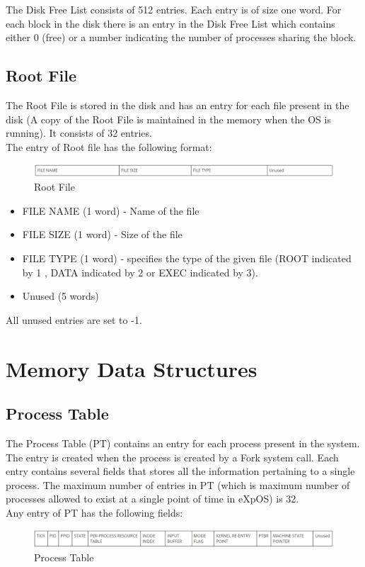 The Disk Free List consists of 512 entries. Each entry is of size one word. For each block in the disk there is an entry in the Disk Free List which contains either 0 (free) or a number indicating the number of processes sharing the block.

\subsection{Root File}

The Root File is stored in the disk and has an entry for each file present in the disk (A copy of the Root File is maintained in the memory when the OS is running). It consists of 32 entries.
\\
The entry of Root file has the following format:
\begin{figure}[ht]
\centering
\includegraphics  [scale=0.55]{figures/ROOT.png}
\caption{\footnotesize Root File}
\end{figure}

\begin{itemize}

\item FILE NAME (1 word) - Name of the file
\item FILE SIZE (1 word) - Size of the file
\item FILE TYPE (1 word) - specifies the type of the given file (ROOT indicated by 1 , DATA indicated by 2 or EXEC indicated by 3).
\item Unused (5 words)

\end{itemize}
All unused entries are set to -1.

\section {Memory Data Structures}

\subsection {Process Table}

The Process Table (PT) contains an entry for each process present in the system. The entry is created when the process is created by a Fork system call. Each entry contains several fields that stores all the information pertaining to a single process. The maximum number of entries in PT (which is maximum number of processes allowed to exist at a single point of time in eXpOS) is 32.
\\
 Any entry of PT has the following fields:
\begin{figure}[ht]
\centering
\includegraphics  [scale=0.55]{figures/pt.png}
\caption{\footnotesize Process Table}
\end{figure}

